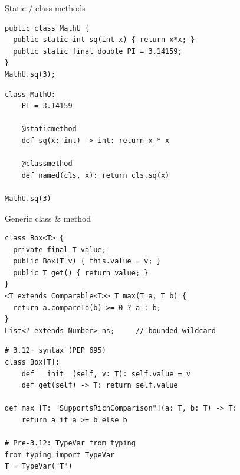 \documentclass[10pt]{article}
\begin{document}
\begin{construct}{Static / class methods}
\noindent
\begin{minipage}[t]{0.485\linewidth}
\begin{lstlisting}[style=java, title=Java]
public class MathU {
  public static int sq(int x) { return x*x; }
  public static final double PI = 3.14159;
}
MathU.sq(3);
\end{lstlisting}
\end{minipage}\hfill
\begin{minipage}[t]{0.485\linewidth}
\begin{lstlisting}[style=python, title=Python]
class MathU:
    PI = 3.14159

    @staticmethod
    def sq(x: int) -> int: return x * x

    @classmethod
    def named(cls, x): return cls.sq(x)

MathU.sq(3)
\end{lstlisting}
\end{minipage}
\end{construct}


\begin{construct}{Generic class \& method}
\noindent
\begin{minipage}[t]{0.485\linewidth}
\begin{lstlisting}[style=java, title=Java]
class Box<T> {
  private final T value;
  public Box(T v) { this.value = v; }
  public T get() { return value; }
}
<T extends Comparable<T>> T max(T a, T b) {
  return a.compareTo(b) >= 0 ? a : b;
}
List<? extends Number> ns;     // bounded wildcard
\end{lstlisting}
\end{minipage}\hfill
\begin{minipage}[t]{0.485\linewidth}
\begin{lstlisting}[style=python, title=Python]
# 3.12+ syntax (PEP 695)
class Box[T]:
    def __init__(self, v: T): self.value = v
    def get(self) -> T: return self.value

def max_[T: "SupportsRichComparison"](a: T, b: T) -> T:
    return a if a >= b else b

# Pre-3.12: TypeVar from typing
from typing import TypeVar
T = TypeVar("T")
\end{lstlisting}
\end{minipage}
\end{construct}
\end{document}
